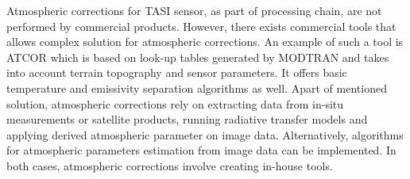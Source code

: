 Atmospheric corrections for TASI sensor, as part of processing chain, are not performed by commercial products. However, there exists commercial tools that allows complex solution for atmospheric corrections. An example of such a tool is ATCOR \cite{RS02} which is based on look-up tables generated by MODTRAN and takes into account terrain topography and sensor parameters. It offers basic temperature and emissivity separation algorithms as well. Apart of mentioned solution, atmospheric corrections rely on extracting data from in-situ measurements or satellite products, running radiative transfer models and applying derived atmospheric parameter on image data. Alternatively, algorithms for atmospheric parameters estimation from image data can be implemented. In both cases, atmospheric corrections involve creating in-house tools.

